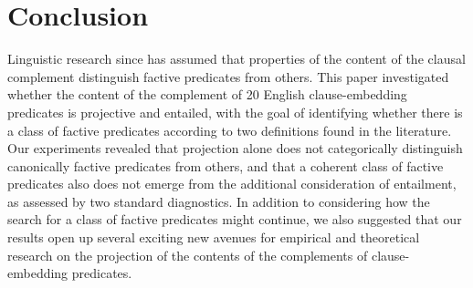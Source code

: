 \documentclass{language}
\newcommand{\6}{\mbox{$[\hspace*{-.6mm}[$}}
\newcommand{\9}{\mbox{$]\hspace*{-.6mm}]$}}
\begin{document}
\section{Conclusion}\label{s5}


Linguistic research since \citealt{kiparsky-kiparsky70} has assumed that properties of the content of the clausal complement distinguish factive predicates from others. This paper investigated whether the content of the complement of 20 English clause-embedding predicates is projective and entailed, with the goal of identifying whether there is a class of factive predicates according to two definitions found in the literature. Our experiments revealed that projection alone does not categorically distinguish canonically factive predicates from others, and that a coherent class of factive predicates also does not emerge from the additional consideration of entailment, as assessed by two standard diagnostics. In addition to considering how the search for a class of factive predicates might continue, we also suggested that our results open up several exciting new avenues for empirical and theoretical research on the projection of the contents of the complements of clause-embedding predicates.

%


%
%
%

\fendnotes

\newpage

\listoftables

\listoffigures
\end{document}
